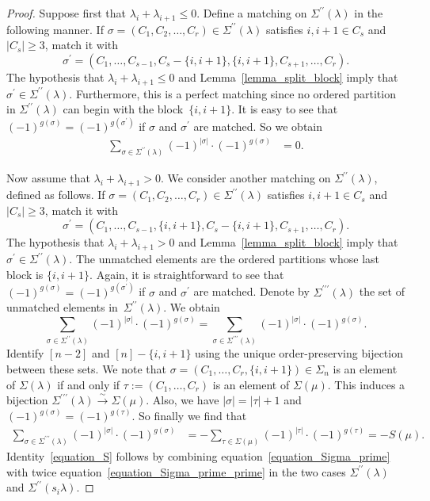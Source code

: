 \documentclass[ALCO,ThmDefs,Unicode,epreuves]{cedram}
\newcommand{\fl}{\rightarrow}
\newcommand{\iso}{\stackrel{\sim}{\fl}}
\begin{document}
\begin{proof}
Suppose first that $\lambda_{i}+\lambda_{i+1}\leq 0$.
Define a matching on $\Sigma^{\prime\prime}(\lambda)$ in the following manner.
If $\sigma=(C_{1},C_{2},\ldots,C_{r}) \in \Sigma^{\prime\prime}(\lambda)$
satisfies
$i, i+1 \in C_{s}$ and $|C_{s}|\geq 3$, match it with
$$ \sigma^{\prime}
=
(C_{1},\ldots,C_{s-1},C_{s}-\{i,i+1\},\{i,i+1\},C_{s+1},\ldots,C_{r}) . $$
The hypothesis that $\lambda_{i}+\lambda_{i+1} \leq 0$
and Lemma~\ref{lemma_split_block}
imply that 
$\sigma^{\prime} \in \Sigma^{\prime\prime}(\lambda)$.
Furthermore, this is a perfect matching
since no ordered partition 
in $\Sigma^{\prime\prime}(\lambda)$
can begin with the block~$\{i,i+1\}$.
It is easy to see that 
$(-1)^{g(\sigma)}=(-1)^{g(\sigma^{\prime})}$ if $\sigma$ and $\sigma^{\prime}$ are matched.
So we obtain
\begin{align*}
\sum_{\sigma\in\Sigma^{\prime\prime}(\lambda)}
(-1)^{|\sigma|} \cdot (-1)^{g(\sigma)}
&=0.
\end{align*}


Now assume that $\lambda_{i}+\lambda_{i+1}>0$.
We consider another matching on $\Sigma^{\prime\prime}(\lambda)$, defined as follows.
If $\sigma=(C_{1}, C_{2}, \ldots, C_{r})\in\Sigma^{\prime\prime}(\lambda)$
satisfies $i, i+1 \in C_{s}$ and $|C_{s}| \geq 3$, match it with
$$ \sigma^{\prime}
= 
(C_{1},\ldots,C_{s-1},\{i,i+1\},C_{s}-\{i,i+1\},C_{s+1},\ldots,C_{r}). $$
The hypothesis that $\lambda_{i}+\lambda_{i+1} > 0$
and Lemma~\ref{lemma_split_block}
imply that 
$\sigma^{\prime} \in \Sigma^{\prime\prime}(\lambda)$.
The unmatched elements
are the ordered partitions whose last block is $\{i, i+1\}$.
Again, it is straightforward to see that 
$(-1)^{g(\sigma)}=(-1)^{g(\sigma^{\prime})}$ if $\sigma$ and $\sigma^{\prime}$ are matched.
Denote by $\Sigma^{\prime\prime\prime}(\lambda)$ the set of unmatched elements
in~$\Sigma^{\prime\prime}(\lambda)$.
We obtain
$$ \sum_{\sigma\in\Sigma^{\prime\prime}(\lambda)}
(-1)^{|\sigma|} \cdot (-1)^{g(\sigma)}
=
\sum_{\sigma\in\Sigma^{\prime\prime\prime}(\lambda)}
(-1)^{|\sigma|} \cdot (-1)^{g(\sigma)} . 
$$
Identify
$[n-2]$ and $[n]-\{i,i+1\}$
using the unique order-preserving bijection between these sets.
We note that
$\sigma=(C_{1}, \ldots, C_{r},\{i,i+1\})\in\Sigma_{n}$
is an element of $\Sigma(\lambda)$ if and only if
$\tau := (C_{1},\ldots,C_{r})$ is an element of $\Sigma(\mu)$.
This induces a bijection $\Sigma^{\prime\prime\prime}(\lambda)\iso\Sigma(\mu)$.
Also, we have $|\sigma|=|\tau|+1$ and $(-1)^{g(\sigma)}=(-1)^{g(\tau)}$.
So finally we find that
\begin{align*}
\sum_{\sigma\in\Sigma^{\prime\prime\prime}(\lambda)}
(-1)^{|\sigma|} \cdot (-1)^{g(\sigma)}
&=
-
\sum_{\tau\in\Sigma(\mu)}
(-1)^{|\tau|} \cdot (-1)^{g(\tau)}
=
-S(\mu).
\end{align*}
Identity~\eqref{equation_S}
follows by combining equation~\eqref{equation_Sigma_prime} 
with twice equation~\eqref{equation_Sigma_prime_prime}
in the two cases
$\Sigma^{\prime\prime}(\lambda)$ and $\Sigma^{\prime\prime}(s_{i} \lambda)$.



\end{proof}
\end{document}
